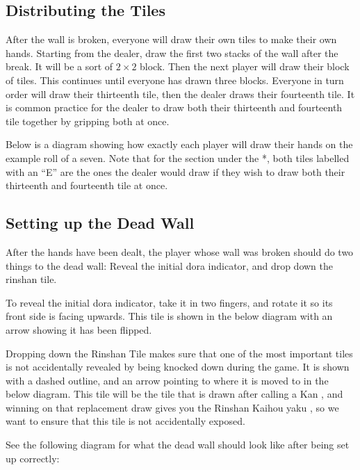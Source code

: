 

\subsection{Distributing the Tiles}\label{core:ssec:distributing}

After the wall is broken, everyone will draw their own tiles to make their own hands. Starting from the dealer, draw the first two stacks of the wall after the break. It will be a sort of \(2 \times 2\) block. Then the next player will draw their block of tiles. This continues until everyone has drawn three blocks. Everyone in turn order will draw their thirteenth tile, then the dealer draws their fourteenth tile. It is common practice for the dealer to draw both their thirteenth and fourteenth tile together by gripping both at once.

Below is a diagram showing how exactly each player will draw their hands on the example roll of a seven. Note that for the section under the *, both tiles labelled with an ``E'' are the ones the dealer would draw if they wish to draw both their thirteenth and fourteenth tile at once.



\subsection{Setting up the Dead Wall}\label{core:ssec:dead-wall}

After the hands have been dealt, the player whose wall was broken should do two things to the dead wall: Reveal the initial dora indicator, and drop down the rinshan tile.

To reveal the initial dora indicator, take it in two fingers, and rotate it so its front side is facing upwards. This tile is shown in the below diagram with an arrow showing it has been flipped.

Dropping down the Rinshan Tile makes sure that one of the most important tiles is not accidentally revealed by being knocked down during the game. It is shown with a dashed outline, and an arrow pointing to where it is moved to in the below diagram. This tile will be the tile that is drawn after calling a Kan , and winning on that replacement draw gives you the Rinshan Kaihou yaku , so we want to ensure that this tile is not accidentally exposed.

See the following diagram for what the dead wall should look like after being set up correctly:

